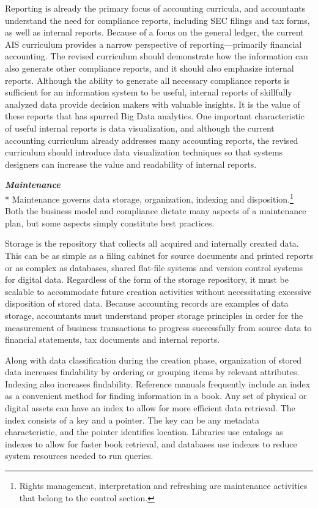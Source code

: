 \documentclass[12pt]{article}
\newcommand{\SubSubSection}[1]{{\centering{}\normalsize{}\textbf{\emph{#1}}}\\*\indent{}}
\begin{document}
Reporting is already the primary focus of accounting curricula, and accountants understand the need for compliance reports, including SEC filings and tax forms, as well as internal reports. Because of a focus on the general ledger, the current AIS curriculum provides a narrow perspective of reporting---primarily financial accounting.  The revised curriculum should demonstrate how the information can also generate other compliance reports, and it should also emphasize internal reports. Although the ability to generate all necessary compliance reports is sufficient for an information system to be useful, internal reports of skillfully analyzed data provide decision makers with valuable insights. It is the value of these reports that has spurred Big Data analytics. One important characteristic of useful internal reports is data visualization, and although the current accounting curriculum already addresses many accounting reports, the revised curriculum should introduce data visualization techniques so that systems designers can increase the value and readability of internal reports.

\SubSubSection{Maintenance}
Maintenance governs data storage, organization, indexing and disposition.\footnote{Rights management, interpretation and refreshing are maintenance activities that belong to the control section.} Both the business model and compliance dictate many aspects of a maintenance plan, but some aspects simply constitute best practices.

Storage is the repository that collects all acquired and internally created data. This can be as simple as a filing cabinet for source documents and printed reports or as complex as databases, shared flat-file systems and version control systems for digital data. Regardless of the form of the storage repository, it must be scalable to accommodate future creation activities without necessitating excessive disposition of stored data. Because accounting records are examples of data storage, accountants must understand proper storage principles in order for the measurement of business transactions to progress successfully from source data to financial statements, tax documents and internal reports.

Along with data classification during the creation phase, organization of stored data increases findability by ordering or grouping items by relevant attributes. Indexing also increases findability. Reference manuals frequently include an index as a convenient method for finding information in a book. Any set of physical or digital assets can have an index to allow for more efficient data retrieval. The index consists of a key and a pointer. The key can be any metadata characteristic, and the pointer identifies location. Libraries use catalogs as indexes to allow for faster book retrieval, and databases use indexes to reduce system resources needed to run queries.
\end{document}
